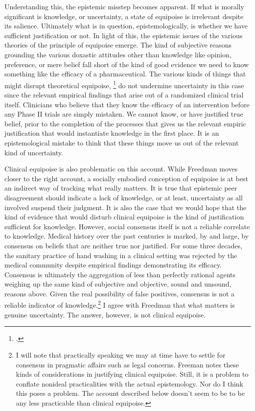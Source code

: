 \documentclass[letterpaper,notitlepage,12pt]{article}
\begin{document}
Understanding this, the epistemic misstep becomes apparent.
If what is morally significant is knowledge, or uncertainty, a state of
equipoise is irrelevant despite its salience.
Ultimately what is in question, epistemologically, is whether we have sufficient
justification or not.
In light of this, the epistemic issues of the various theories of the principle
of equipoise emerge.
The kind of subjective reasons grounding the various doxastic attitudes other
than knowledge like opinion, preference, or mere belief fall short of the kind
of good evidence we need to know something like the efficacy of a
pharmaceutical.
The various kinds of things that might disrupt theoretical equipoise,
\footcite[p. 429]{freedman_equipoise_1987} do not undermine
uncertainty in this case since the relevant empirical findings that arise out of
a randomized clinical trial itself.
Clinicians who believe that they know the efficacy of an intervention before any
Phase II trials are simply mistaken.
We cannot know, or have justified true belief, prior to the completion of the
processes that gives us the relevant empiric justification that would instantiate
knowledge in the first place.
It is an epistemological mistake to think that these things move us out of the
relevant kind of uncertainty.

Clinical equipoise is also problematic on this account.
While Freedman moves closer to the right account, a socially embodied conception
of equipoise is at best an indirect way of tracking what really matters.
It is true that epistemic peer disagreement should indicate a lack of knowledge,
or at least, uncertainty as all involved suspend their judgment.
It is also the case that we would hope that the kind of evidence that would
disturb clinical equipoise is the kind of justification sufficient for
knowledge.
However, social consensus itself is not a reliable correlate to knowledge.
Medical history over the past centuries is marked, by and large, by consensus on
beliefs that are neither true nor justified.
For some three decades, the sanitary practice of hand washing in a clinical
setting was rejected by the medical community despite empirical findings
demonstrating its efficacy.
Consensus is ultimately the aggregation of less than perfectly rational agents
weighing up the same kind of subjective and objective, sound and unsound,
reasons above.
Given the real possibility of false positives, consensus is not a reliable
indicator of knowledge.\footnote{I will note that practically speaking we may at
  time have to settle for consensus in pragmatic affairs such as legal concerns.
  Freeman notes these kinds of considerations in justifying clinical equipoise.
  Still, it is a problem to conflate nonideal practicalities with the actual
  epistemology. Nor do I think this poses a problem. The account described below
doesn't seem to be to be any less practicable than clinical equipoise.}
I agree with Freedman that what matters is genuine uncertainty.
The answer, however, is not clinical equipoise.
\end{document}
